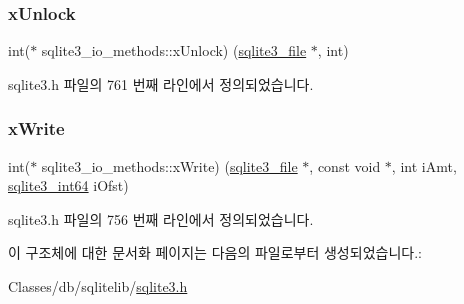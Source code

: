 \subsubsection{\texorpdfstring{x\+Unlock}{xUnlock}}
{\footnotesize\ttfamily int($\ast$ sqlite3\+\_\+io\+\_\+methods\+::x\+Unlock) (\hyperlink{structsqlite3__file}{sqlite3\+\_\+file} $\ast$, int)}



sqlite3.\+h 파일의 761 번째 라인에서 정의되었습니다.

\mbox{\label{structsqlite3__io__methods_a659f6a40777b685c6a6b80e5f07a3328}} 
\subsubsection{\texorpdfstring{x\+Write}{xWrite}}
{\footnotesize\ttfamily int($\ast$ sqlite3\+\_\+io\+\_\+methods\+::x\+Write) (\hyperlink{structsqlite3__file}{sqlite3\+\_\+file} $\ast$, const void $\ast$, int i\+Amt, \hyperlink{sqlite3_8h_a0a4d3e6c1ad46f90e746b920ab6ca0d2}{sqlite3\+\_\+int64} i\+Ofst)}



sqlite3.\+h 파일의 756 번째 라인에서 정의되었습니다.



이 구조체에 대한 문서화 페이지는 다음의 파일로부터 생성되었습니다.\+:\begin{DoxyCompactItemize}
\item 
Classes/db/sqlitelib/\hyperlink{sqlite3_8h}{sqlite3.\+h}\end{DoxyCompactItemize}

